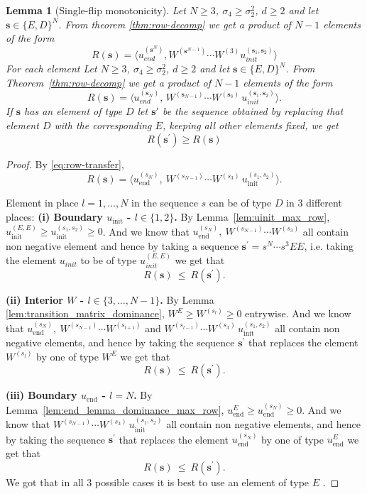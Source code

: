 \documentclass[12pt,a4paper]{article}
\newtheorem{lemma}[theorem]{Lemma}
\begin{document}
\begin{lemma}[Single-flip monotonicity]\label{lem:flip}
Let $N\ge3$, $\sigma_4\ge\sigma_2^2$, $d\ge2$ and let $\mathbf{s}\in\{E,D\}^N$.
From theorem \ref{thm:row-decomp} we get a product of $N-1$  elements of the form $$R(\mathbf{s})=\langle u_{end}^{(\mathbf{s}^N)},W^{(\mathbf{s}^{N-1})}\cdots W^{(3)}u_{init}^{(\mathbf{s}_1,\mathbf{s}_2)}\rangle$$
For each element 
Let $N\ge3$, $\sigma_4\ge\sigma_2^2$, $d\ge2$ and let $\mathbf{s}\in\{E,D\}^N$.
From Theorem~\ref{thm:row-decomp} we get a product of $N-1$ elements of the form
\[
R(\mathbf{s})=\bigl\langle u_{end}^{(\mathbf{s}_N)},\,W^{(\mathbf{s}_{N-1})}\cdots W^{(\mathbf{s}_3)}\,u_{init}^{(\mathbf{s}_1,\mathbf{s}_2)}\bigr\rangle .
\]
If  $\mathbf{s}$ has an element of type $D$ let $\mathbf{s}'$ be the sequence obtained by replacing that element $D$ with the corresponding $E$, keeping all other elements fixed, we get $$R(\mathbf{s}^\prime)\ge R(\mathbf{s})$$
\end{lemma}
\begin{proof}

By \eqref{eq:row-transfer},
\[
R(\mathbf{s})=\bigl\langle u_\mathrm{end}^{(s_N)},\ W^{(s_{N-1})}\cdots W^{(s_3)}\,u_\mathrm{init}^{(s_1,s_2)}\bigr\rangle .
\]

Element in place $l=1,...,N$  in the sequence $s$  can be of type $D$  in 3 different places:
\smallskip\noindent\textbf{(i) Boundary $u_\mathrm{init}$ - $l\in\{1,2\}$.}
By Lemma~\ref{lem:uinit_max_row}, $u_\mathrm{init}^{(E,E)}\ge u_\mathrm{init}^{(s_1,s_2)}\ge0$. And we know that $ u_\mathrm{end}^{(s_N)},\ W^{(s_{N-1})}\cdots W^{(s_3)}$ all contain non negative element and hence by taking a sequence $\mathbf{s^\prime}=s^N\cdots s^3EE$, i.e. taking the element $u_{init}$  to be of type $u_{init}^{(E,E)}$  we get that
\[
R(\mathbf{s})\ \le\ R(\mathbf{s}^\prime).
\]

\smallskip\noindent\textbf{(ii) Interior $W$ - $l\in\{3,\dots,N-1\}$.}
By Lemma \ref{lem:transition_matrix_dominance}, $W^{E}\ge W^{(s_l)}\ge0$ entrywise. And we know that $u_\mathrm{end}^{(s_N)},\ W^{(s_{N-1})}\cdots W^{(s_{l+1})}$ and
$W^{(s_{l-1})}\cdots W^{(s_3)}\,u_\mathrm{init}^{(s_1,s_2)}$ all contain non negative elements, and hence by taking the sequence $\mathbf{s}^\prime$ that replaces the element
$W^{(s_l)}$ by one of type $W^{E}$ we get that
\[
R(\mathbf{s})\ \le\ R(\mathbf{s}^\prime).
\]

\smallskip\noindent\textbf{(iii) Boundary $u_\mathrm{end}$ - $l=N$.}
By Lemma~\ref{lem:end_lemma_dominance_max_row}, $u_\mathrm{end}^{E}\ge u_\mathrm{end}^{(s_N)}\ge0$.
And we know that $W^{(s_{N-1})}\cdots W^{(s_3)}\,u_\mathrm{init}^{(s_1,s_2)}$ all contain non negative elements, and hence by taking the sequence $\mathbf{s}^\prime$ that replaces the element $u_\mathrm{end}^{(s_N)}$ by one of type $u_\mathrm{end}^{E}$ we get that
\[
R(\mathbf{s})\ \le\ R(\mathbf{s}^\prime).
\]
We got that in all $3$  possible cases it is best to use an element of type $E$ .
\end{proof}
\end{document}
